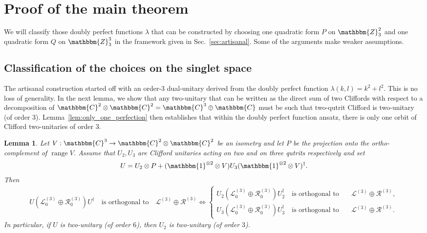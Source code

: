 \documentclass[aps,nofootinbib,floatfix,a4paper]{revtex4}
\newtheorem{lemma}[theorem]{Lemma}
\newcommand{\1}{\mbox{$\mathbf{1}$}}
\def\ZZ{\mathbbm{Z}}
\def\CC{\mathbbm{C}}
\def\R{\mathcal{R}}
\def\Id{\mathbbm{1}}
\DeclareMathOperator{\range}{range}
\begin{document}
\section{Proof of the main theorem}
\label{sec:uniqueness}

We will classify those doubly perfect functions $\lambda$ that can be constructed by choosing one quadratic form $P$ on $\ZZ_3^2$ and one quadratic form $Q$ on $\ZZ_3^3$ in the framework given in Sec.~\ref{sec:artisanal}.
Some of the arguments make weaker assumptions.

\subsection{Classification of the choices on the singlet space}
\label{sec:u2}

The artisanal construction started off with an order-$3$ dual-unitary derived from the doubly perfect function $\lambda(k,l)=k^2+l^2$.
This is no loss of generality.
In the next lemma, we show that any two-unitary that can be written as the direct sum of two Cliffords with respect to a decomposition of $\CC^2\otimes \CC^2 = \CC^3\oplus \CC$ must be such that two-qutrit Clifford is two-unitary (of order 3).
Lemma~\ref{lem:only_one_perfection} then establishes that within the doubly perfect function ansatz, there is only one orbit of Clifford two-unitaries of order $3$.

\begin{lemma}\label{lem:u2_is_two_unnitary}
	Let $V: \CC^3\to \CC^2\otimes \CC^2$ be an isometry
	and
	let $P$ be the projection onto the ortho-complement of $\range V$.
	Assume that $U_2, U_3$ are Clifford unitaries acting on two and on three qutrits respectively and set
	\begin{align*}
		U
		= 
		U_2 \otimes P
		+
		(\Id^{\otimes 2} \otimes V)
		U_3 
		(\Id^{\otimes 2} \otimes V)^\dagger.
	\end{align*}
	Then 
	\begin{align*}
		U(\mathcal{L}^{(3)}_0\oplus\R^{(3)}_0)U^\dagger
		\quad\text{is orthogonal to}\quad\mathcal{L}^{(3)}\oplus \R^{(3)}
				 \Leftrightarrow
				 \left\{
					 \begin{array}{ll}
						U_2(\mathcal{L}^{(3)}_0\oplus\R^{(3)}_0)U_2^\dagger
						\quad\text{is orthogonal to}\quad& \mathcal{L}^{(3)}\oplus \R^{(3)}, \\
						U_3(\mathcal{L}^{(3)}_0\oplus\R^{(3)}_0)U_3^\dagger
						\quad\text{is orthogonal to}\quad& \mathcal{L}^{(3)}\oplus \R^{(3)}.
			\end{array}
		\right.
	\end{align*}
	In particular, if $U$ is two-unitary (of order $6$), then $U_2$ is two-unitary (of order $3$).
\end{lemma}
\end{document}
